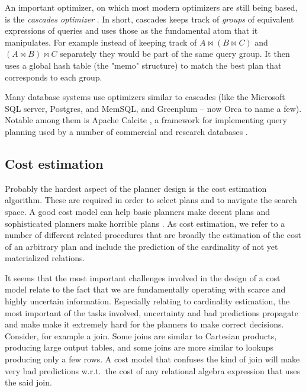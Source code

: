 An important optimizer, on which most modern optimizers are still
being based, is the \emph{cascades optimizer}
\cite{graefeCascadesFrameworkQuery1995}. In short, cascades keeps
track of \emph{groups} of equivalent expressions of queries and uses
those as the fundamental atom that it manipulates. For example instead
of keeping track of \(A \Join (B \Join C)\) and
\((A \Join B) \Join C\) separately they would be part of the same
query group. It then uses a global hash table (the "memo" structure)
to match the best plan that corresponds to each group.

Many database systems use optimizers similar to cascades (like the
Microsoft SQL server, Postgres, and
MemSQL\cite{chenMemSQLQueryOptimizer2016}, and Greenplum -- now Orca
\cite{solimanOrcaModularQuery2014a} to name a few). Notable among them
is Apache Calcite \cite{begoliApacheCalciteFoundational2018}, a
framework for implementing query planning used by a number of
commercial and research databases
\cite{nunesalonsoBuildingPolyglotData2020}.

\subsection{Cost estimation}

Probably the hardest aspect of the planner design is the cost
estimation algorithm. These are required in order to select plans and
to navigate the search space. A good cost model can help basic
planners make decent plans and sophisticated planners make horrible
plans \cite{leisHowGoodAre2015}. As cost estimation, we refer to a
number of different related procedures that are broadly the estimation
of the cost of an arbitrary plan and include the prediction of the
cardinality of not yet materialized relations.

It seems that the most important challenges involved in the design of
a cost model relate to the fact that we are fundamentally operating
with scarce and highly uncertain information. Especially relating to
cardinality estimation, the most important of the tasks involved,
uncertainty and bad predictions propagate and make make it extremely
hard for the planners to make correct decisions. Consider, for example a
join. Some joins are similar to Cartesian products, producing large
output tables, and some joins are more similar to lookups producing
only a few rows. A cost model that confuses the kind of join will make
very bad predictions w.r.t.\ the cost of any relational algebra
expression that uses the said join.

